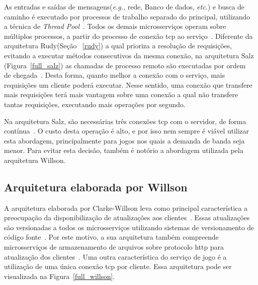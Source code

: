 As entradas e saídas de mensagens(\textit{e.g.,} rede, Banco de dados, \textit{etc.}) e busca de caminho é executado por processos de trabalho separado do principal, utilizando a técnica de \textit{Thread Pool}~\cite{salz_albion, albion_online_unite, Ringler2014Dec}.
%
Todos os demais microsserviços operam sobre múltiplos processos, a partir do processo de conexão \ac{tcp} ao serviço~\cite{salz_albion}.
%
Diferente da arquitetura Rudy(Seção ~\ref{rudy}) a qual prioriza a resolução de requisições, evitando a executar métodos consecutivos da mesma conexão, na arquitetura Salz (Figura~\ref{full_salz}) as chamadas de processo remoto são executadas por ordem de chegada~\cite{salz_albion}.
%
Desta forma, quanto melhor a conexão com o serviço, mais requisições um cliente poderá executar.
%
Nesse sentido, uma conexão que transfere mais requisições terá mais vantagem sobre uma conexão a qual não transfere tantas requisições, executando mais operações por segundo.



Na arquitetura Salz, são necessárias três conexões \ac{tcp} com o servidor, de forma contínua~\cite{albion_online_unite}.
%
O custo desta operação é alto, e por isso nem sempre é viável utilizar esta abordagem, principalmente para jogos nos quais a demanda de banda seja menor.
%
Para evitar esta decisão, também é notório a abordagem utilizada pela arquitetura Willson.



\subsection{Arquitetura elaborada por Willson}
\label{willson}


A arquitetura elaborada por Clarke-Willson leva como principal característica a preocupação da disponibilização de atualizações aos clientes~\cite{willson}.
%
Essas atualizações são versionadas a todos os microsserviços utilizando sistemas de versionamento de código fonte~\cite{stephenclarkewillson2017, willson}.
%
Por este motivo, a sua arquitetura também compreende microsserviços de armazenamento de arquivos sobre protocolo \ac{http} para atualização dos clientes~\cite{stephenclarkewillson2017}.
%
Uma outra característica do serviço de jogo é a utilização de uma única conexão \ac{tcp} por cliente.
%
Essa arquitetura pode ser visualizada na Figura~\ref{full_willson}.


